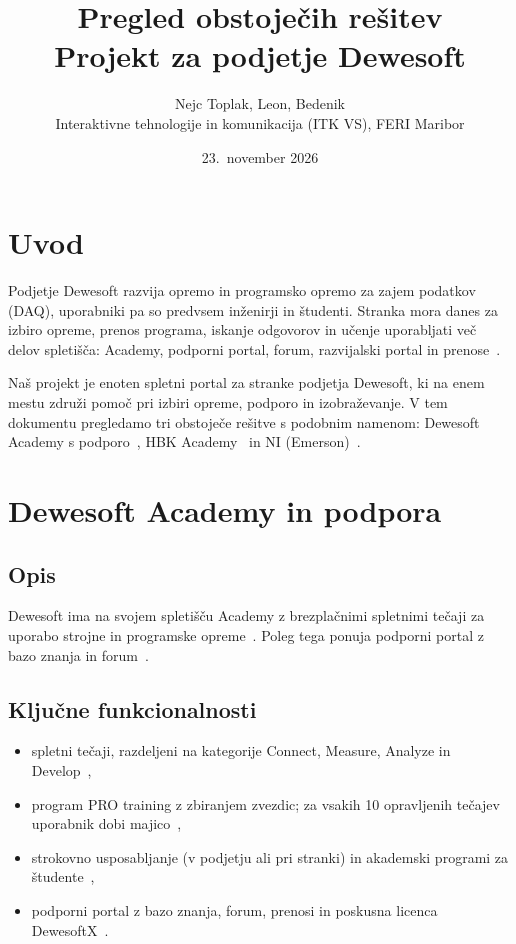 \documentclass[a4paper,11pt]{article}
\title{Pregled obstoječih rešitev\\[4pt]\large Projekt za podjetje Dewesoft}
\author{Nejc Toplak, Leon, Bedenik\\[4pt]
Interaktivne tehnologije in komunikacija (ITK VS), FERI Maribor}
\date{23.~november 2026}
\begin{document}
\maketitle

\section{Uvod}
Podjetje Dewesoft razvija opremo in programsko opremo za zajem podatkov (DAQ), uporabniki pa so predvsem inženirji in študenti. Stranka mora danes za izbiro opreme, prenos programa, iskanje odgovorov in učenje uporabljati več delov spletišča: Academy, podporni portal, forum, razvijalski portal in prenose~\cite{dws-signin}.

Naš projekt je enoten spletni portal za stranke podjetja Dewesoft, ki na enem mestu združi pomoč pri izbiri opreme, podporo in izobraževanje. V tem dokumentu pregledamo tri obstoječe rešitve s podobnim namenom: Dewesoft Academy s podporo~\cite{dws-academy}, HBK Academy~\cite{hbk-academy} in NI (Emerson)~\cite{ni-dashboard}.

\section{Dewesoft Academy in podpora}
\subsection*{Opis}
Dewesoft ima na svojem spletišču Academy z brezplačnimi spletnimi tečaji za uporabo strojne in programske opreme~\cite{dws-signin}. Poleg tega ponuja podporni portal z bazo znanja in forum~\cite{dws-signin}.

\subsection*{Ključne funkcionalnosti}
\begin{itemize}
  \item spletni tečaji, razdeljeni na kategorije Connect, Measure, Analyze in Develop~\cite{dws-online},
  \item program PRO training z zbiranjem zvezdic; za vsakih 10 opravljenih tečajev uporabnik dobi majico~\cite{dws-pro},
  \item strokovno usposabljanje (v podjetju ali pri stranki) in akademski programi za študente~\cite{dws-prof,dws-academia},
  \item podporni portal z bazo znanja, forum, prenosi in poskusna licenca DewesoftX~\cite{dws-signin}.
\end{itemize}
\end{document}
